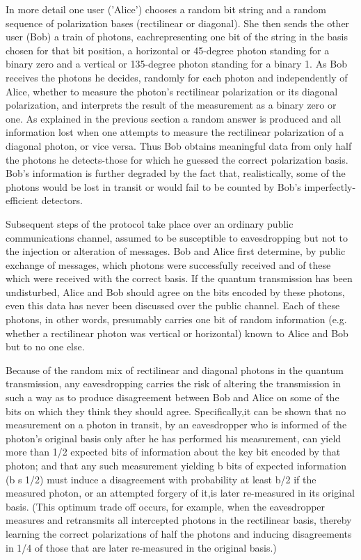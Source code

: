 In more detail one user ('Alice') chooses a random bit string and a random sequence of polariza­tion bases (rectilinear or diagonal). She then sends the other user (Bob) a train of photons, eachrepresenting one bit of the string in the basis cho­sen for that bit position, a horizontal or 45-degree photon standing for a binary zero and a vertical or 135-degree photon standing for a binary 1. As Bob receives the photons he decides, randomly for each photon and independently of Alice, whether to meas­ure the photon's rectilinear polarization or its diagonal polarization, and interprets the result of the measurement as a binary zero or one. As ex­plained in the previous section a random answer is produced and all information lost when one attempts to measure the rectilinear polarization of a diago­nal photon, or vice versa. Thus Bob obtains mean­ingful data from only half the photons he detects-­those for which he guessed the correct polarization basis. Bob's information is further degraded by the fact that, realistically, some of the photons would be lost in transit or would fail to be counted by Bob's imperfectly-efficient detectors.

Subsequent steps of the protocol take place over an ordinary public communications channel, as­sumed to be susceptible to eavesdropping but not to the injection or alteration of messages. Bob and Alice first determine, by public exchange of mes­sages, which photons were successfully received and of these which were received with the correct basis. If the quantum transmission has been undisturbed, Alice and Bob should agree on the bits encoded by these photons, even this data has never been dis­cussed over the public channel. Each of these pho­tons, in other words, presumably carries one bit of random information (e.g. whether a rectilinear pho­ton was vertical or horizontal) known to Alice and Bob but to no one else.

Because of the random mix of rectilinear and diagonal photons in the quantum transmission, any eavesdropping carries the risk of altering the transmission in such a way as to produce disagree­ment between Bob and Alice on some of the bits on which they think they should agree. Specifically,it can be shown that no measurement on a photon in transit, by an eavesdropper who is informed of the photon's original basis only after he has performed his measurement, can yield more than 1/2 expected bits of information about the key bit encoded by that photon; and that any such measurement yielding b bits of expected information (b s 1/2) must induce a disagreement with probability at least b/2 if the measured photon, or an attempted forgery of it,is later re-measured in its original basis. (This optimum trade off occurs, for example, when the ea­vesdropper measures and retransmits all intercepted photons in the rectilinear basis, thereby learning the correct polarizations of half the photons and inducing disagreements in 1/4 of those that are lat­er re-measured in the original basis.)

